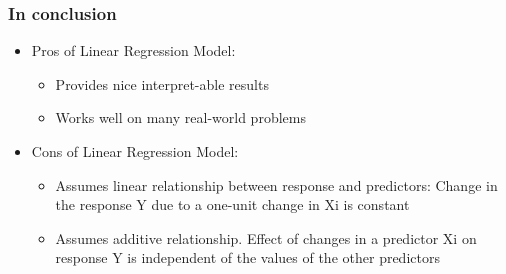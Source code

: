 

\begin{frame}[fragile]\frametitle{In conclusion}
\begin{itemize}
\item Pros of Linear Regression Model: 
	\begin{itemize}
	\item Provides nice interpret-able results
	\item Works well on many real-world problems
	\end{itemize}
\item Cons of Linear Regression Model:
	\begin{itemize}
	\item Assumes linear relationship between response and predictors: Change in the response Y due to a one-unit change in Xi is constant
	\item Assumes additive relationship. Effect of changes in a predictor Xi on response Y is independent of the values of the other predictors
	\end{itemize}
\end{itemize}
\end{frame}

